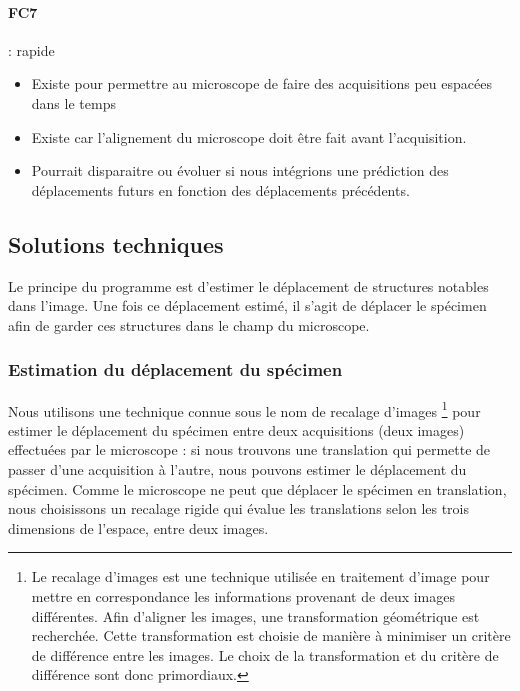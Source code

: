 \paragraph*{FC7} : rapide
\begin{itemize}
  \item Existe pour permettre au microscope de faire des acquisitions peu espacées dans le temps
  \item Existe car l'alignement du microscope doit être fait avant l'acquisition.
  \item Pourrait disparaitre ou évoluer si nous intégrions une prédiction
  des déplacements futurs en fonction des déplacements précédents.
\end{itemize}

\subsection{Solutions techniques}

Le principe du programme est d'estimer le déplacement de structures notables dans l'image.
Une fois ce déplacement estimé, il s'agit de déplacer le spécimen afin de garder ces structures dans le champ du microscope.

\subsubsection{Estimation du déplacement du spécimen}
Nous utilisons une technique connue sous le nom de recalage d'images
\footnote{Le recalage d'images est une technique utilisée en traitement d'image pour mettre en correspondance les informations
provenant de deux images différentes. Afin d'aligner les images, une transformation géométrique est recherchée.
Cette transformation est choisie de manière à minimiser un critère de différence entre les images.
Le choix de la transformation et du critère de différence sont donc primordiaux.}
 pour estimer le déplacement du spécimen entre deux acquisitions (deux images) effectuées par le microscope : si nous trouvons une translation qui permette de passer d'une acquisition à l'autre, nous pouvons estimer le déplacement du spécimen.
Comme le microscope ne peut que déplacer le spécimen en translation, nous choisissons un recalage rigide qui évalue les translations selon les trois dimensions de l'espace, entre deux images.

